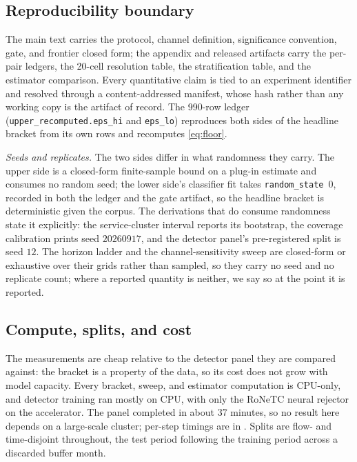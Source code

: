 \documentclass[sigconf,anonymous,review]{acmart}
\begin{document}
\subsection{Reproducibility boundary}
\label{sec:design/repro}

The main text carries the protocol, channel definition, significance
convention, gate, and frontier closed form; the appendix and released artifacts
carry the per-pair ledgers, the 20-cell resolution table, the stratification
table, and the estimator comparison. Every quantitative claim is tied to an
experiment identifier and resolved through a content-addressed manifest, whose
hash rather than any working copy is the artifact of record. The 990-row ledger
(\texttt{upper\_recomputed.eps\_hi} and \texttt{eps\_lo}) reproduces both sides
of the headline bracket from its own rows and recomputes \eqref{eq:floor}.

\emph{Seeds and replicates.} The two sides differ in what randomness they carry.
The upper side is a closed-form finite-sample bound on a plug-in estimate and
consumes no random seed; the lower side's classifier fit takes
\texttt{random\_state}~$0$, recorded in both the ledger and the gate artifact, so
the headline bracket is deterministic given the corpus. The derivations that do
consume randomness state it explicitly: the service-cluster interval reports its
bootstrap, the coverage calibration prints seed $20260917$, and the detector
panel's pre-registered split is seed $12$. The horizon ladder and the
channel-sensitivity sweep are closed-form or exhaustive over their grids rather
than sampled, so they carry no seed and no replicate count; where a reported
quantity is neither, we say so at the point it is reported.

\subsection{Compute, splits, and cost}
\label{sec:design/compute}

The measurements are cheap relative to the detector panel they are compared
against: the bracket is a property of the data, so its cost does not grow with
model capacity. Every bracket, sweep, and estimator computation is CPU-only, and
detector training ran mostly on CPU, with only the RoNeTC neural rejector on the
accelerator. The panel completed in about 37 minutes, so no result here depends
on a large-scale cluster; per-step timings are in . Splits are flow-
and time-disjoint throughout, the test period following the training period
across a discarded buffer month.
\end{document}
